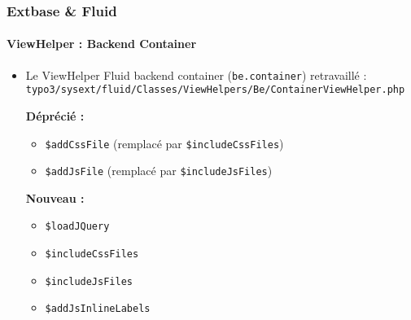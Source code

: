 
\begin{frame}[fragile]
	\frametitle{Extbase \& Fluid}
	\framesubtitle{ViewHelper : Backend Container}

	\lstset{
		basicstyle=\smaller\ttfamily
	}

	\begin{itemize}
		\item Le ViewHelper Fluid backend container (\texttt{be.container}) retravaillé :\newline
			\smaller\texttt{typo3/sysext/fluid/Classes/ViewHelpers/Be/ContainerViewHelper.php}\normalsize\newline

			\smaller\textbf{Déprécié :}\normalsize
			\begin{itemize}
				\item \texttt{\$addCssFile} (remplacé par \texttt{\$includeCssFiles})
				\item \texttt{\$addJsFile} (remplacé par \texttt{\$includeJsFiles})
			\end{itemize}

			\smaller\textbf{Nouveau :}\normalsize
			\begin{itemize}
				\item \texttt{\$loadJQuery}
				\item \texttt{\$includeCssFiles}
				\item \texttt{\$includeJsFiles}
				\item \texttt{\$addJsInlineLabels}
			\end{itemize}

	\end{itemize}

\end{frame}


